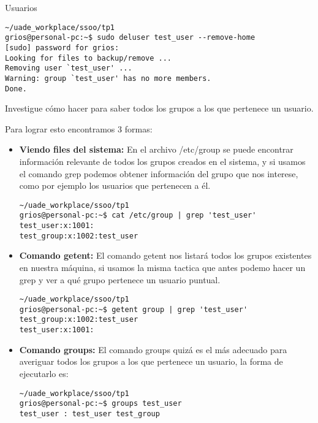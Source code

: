 \begin{section}{Usuarios}
\begin{lstlisting}[style=Ubuntu]
~/uade_workplace/ssoo/tp1
grios@personal-pc:~$ sudo deluser test_user --remove-home  
[sudo] password for grios: 
Looking for files to backup/remove ...
Removing user `test_user' ...
Warning: group `test_user' has no more members.
Done.

\end{lstlisting}


\begin{quoting}
Investigue cómo hacer para saber todos los grupos a los que pertenece un usuario.
\end{quoting}

Para lograr esto encontramos 3 formas:

\begin{itemize}

\item \textbf{Viendo files del sistema:}
En el archivo /etc/group se puede encontrar información relevante de todos los grupos creados en el sistema, y si usamos el comando grep podemos obtener información del grupo que nos interese, como por ejemplo los usuarios que pertenecen a él.

\begin{lstlisting}[style=Ubuntu]
~/uade_workplace/ssoo/tp1
grios@personal-pc:~$ cat /etc/group | grep 'test_user'
test_user:x:1001:
test_group:x:1002:test_user
\end{lstlisting}

\item \textbf{Comando getent:}
El comando getent nos listará todos los grupos existentes en nuestra máquina, si usamos la misma tactica que antes podemo hacer un grep y ver a qué grupo pertenece un usuario puntual.

\begin{lstlisting}[style=Ubuntu]
~/uade_workplace/ssoo/tp1
grios@personal-pc:~$ getent group | grep 'test_user'
test_group:x:1002:test_user
test_user:x:1001:
\end{lstlisting}

\item \textbf{Comando groups:}
El comando groups quizá es el más adecuado para averiguar todos los grupos a los que pertenece un usuario, la forma de ejecutarlo es:

\begin{lstlisting}[style=Ubuntu]
~/uade_workplace/ssoo/tp1
grios@personal-pc:~$ groups test_user
test_user : test_user test_group
\end{lstlisting}

\end{itemize}
\end{section}